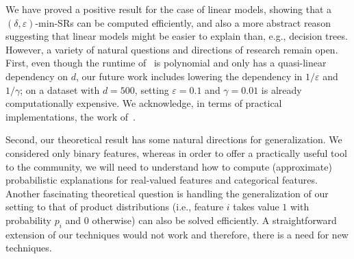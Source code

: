 We have proved a positive result for the case of linear models, showing that a $(\delta, \varepsilon)$-min-SRs can be computed efficiently, and also a more abstract reason suggesting that linear models might be easier to explain than, e.g., decision trees. However,  a variety of natural questions and directions of research remain open. First, even though the runtime of~ is polynomial and only has a quasi-linear dependency on $d$, our future work includes lowering the dependency in $1/\varepsilon$ and $1/\gamma$; on a dataset with $d = 500$, setting $\varepsilon = 0.1$ and $\gamma = 0.01$ is already computationally expensive. We acknowledge, in terms of practical implementations, the work of~\citet{Louenas,izza2024locallyminimalprobabilisticexplanations,izzaComputingProbabilisticAbductive2023}. 

Second, our theoretical result has some natural directions for generalization. We considered only binary features, whereas in order to offer a practically useful tool to the community, we will need to understand how to compute (approximate) probabilistic explanations for real-valued features and categorical features. Another  fascinating theoretical question is handling the generalization of our setting to that of product distributions (i.e., feature $i$ takes value $1$ with probability $p_i$ and $0$ otherwise) can also be solved efficiently. A straightforward extension of our techniques would not work and therefore, there is a need for new techniques.  
 
